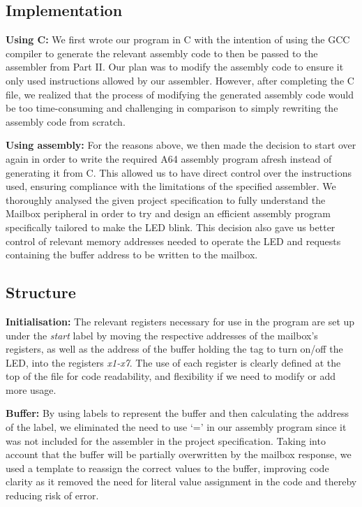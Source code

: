 \documentclass{article}
\begin{document}
        \begin{adjustwidth}{2em}{0pt}
        \subsection{Implementation} 
         
             \textbf{Using C: }We first wrote our program in C with the intention of using the GCC compiler to generate the relevant assembly code to then be passed to the assembler from Part II. Our plan was to modify the assembly code to ensure it only used instructions allowed by our assembler. However, after completing the C file, we realized that the process of modifying the generated assembly code would be too time-consuming and challenging in comparison to simply rewriting the assembly code from scratch.
            
            \textbf{Using assembly: }For the reasons above, we then made the decision to start over again in order to write the required A64 assembly program afresh instead of generating it from C. This allowed us to have direct control over the instructions used, ensuring compliance with the limitations of the specified assembler. We thoroughly analysed the given project specification to fully understand the Mailbox peripheral in order to try and design an efficient assembly program specifically tailored to make the LED blink. This decision also gave us better control of relevant memory addresses needed to operate the LED and requests containing the buffer address to be written to the mailbox.
    
        \subsection{Structure}
        
            \textbf{Initialisation: }The relevant registers necessary for use in the program are set up under the \textit{start} label by moving the respective addresses of the mailbox's registers, as well as the address of the buffer holding the tag to turn on/off the LED, into the registers \textit{x1-x7}. The use of each register is clearly defined at the top of the file for code readability, and flexibility if we need to modify or add more usage.
            
            \textbf{Buffer: }By using labels to represent the buffer and then calculating the address of the label, we eliminated the need to use ‘=’ in our assembly program since it was not included for the assembler in the project specification. Taking into account that the buffer will be partially overwritten by the mailbox response, we used a template to reassign the correct values to the buffer, improving code clarity as it removed the need for literal value assignment in the code and thereby reducing risk of error.
            

\end{adjustwidth}
\end{document}
